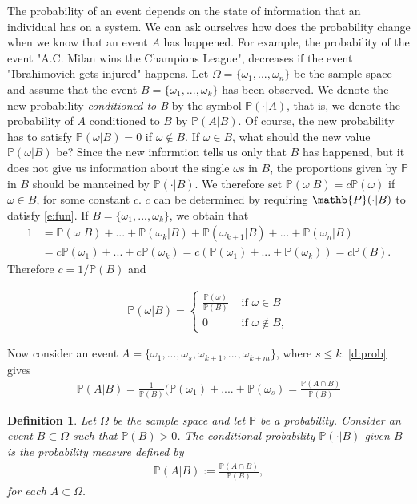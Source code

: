\documentclass[12pt]{article}
\newtheorem{definition}[theorem]{Definition}
\newcommand{\<}{{\langle \!\! \langle}}
\renewcommand{\>}{{\rangle \!\! \rangle}}
\newcommand{\bel}[2]{\begin{equation} \label{#1} \begin{split} #2
 					\end{split} \end{equation}}
\begin{document}
The probability of an event depends on the state of information that an individual has on a  system. We can ask ourselves how does the probability change when we know that an event $A$ has happened. For example, the probability of the event "A.C. Milan wins the Champions League", decreases if the event "Ibrahimovich gets injured" happens. 
Let $\Omega=\{\omega_1,...,\omega_n\}$ be the sample space and assume that the event $B=\{\omega_1,...,\omega_k\}$ has been observed. We denote the new probability \emph{conditioned to B} by the symbol $\mathbb{P}(\cdot| A) $, that is, we denote the probability of $A$ conditioned to $B$ by $\mathbb{P}(A|B)$. Of course, the new probability has to satisfy  $\mathbb{P}(\omega|B)=0$ if $\omega\notin B$. If $\omega\in B$, what should the new value $\mathbb{P}(\omega|B)$ be? Since the new informtion tells us only that $B$ has happened, but it does not give us information about the single $\omega$s in $B$, the proportions given by $\mathbb{P}$ in $B$ should be manteined by $\mathbb{P}(\cdot|B)$. We therefore set $\mathbb{P}(\omega|B)=c\mathbb{P}(\omega)$ if $\omega\in B$, for some constant $c$. $c$ can be determined by requiring $\mathb{P}(\cdot|B)$  to datisfy \eqref{e:fun}. If $B=\{\omega_1,...,\omega_k\}$, we obtain that 
\bel{}{1 & =\mathbb{P}(\omega|B)+...+\mathbb{P}(\omega_k|B)+\mathbb{P}(\omega_{k+1}|B)+...+\mathbb{P}(\omega_n|B)
\\ &=c\mathbb{P}(\omega_1)+...+c\mathbb{P}(\omega_k)=c(\mathbb{P}(\omega_1)+...+\mathbb{P}(\omega_k))=c\mathbb{P}(B).
}
Therefore $c=1/\mathbb{P}(B)$ and

\bel{e:condi}{
\mathbb{P}(\omega|B)=\begin{cases}
	\frac{\mathbb{P}(\omega)}{\mathbb{P}(B)} & \textrm{ if }\omega\in B\\
0 & \textrm{ if } \omega \notin B,
\end{cases}} 

Now consider an event $A=\{\omega_1,...,\omega_s,\omega_{k+1},...,\omega_{k+m}\}$, where $s \leq k$. \eqref{d:prob}  gives \bel{}{\mathbb{P}(A|B)=\frac{1}{\mathbb{P}(B)}(\mathbb{P}(\omega_1)+....+\mathbb{P}(\omega_s) = \frac{\mathbb{P}(A \cap B)}{\mathbb{P}(B)}}



\begin{definition}
\label{conditional}
	Let $\Omega$ be the sample space and let $\mathbb{P}$ be a probability. Consider an event $B\subset \Omega$ such that $\mathbb{P}(B)>0$. The conditional probability $\mathbb{P}(\cdot |B)$ given $B$ is the probability measure defined by   
	\bel{}{\mathbb{P}(A\vert B):= \frac{\mathbb{P}(A\cap B)}{\mathbb{P}(B)}, }
	for each $A\subset\Omega$.
\end{definition}
\end{document}
